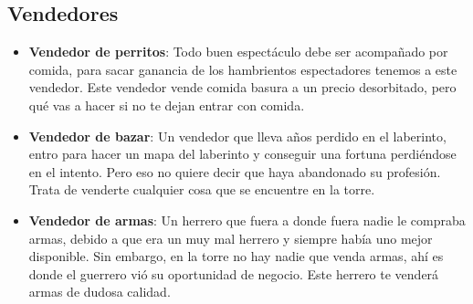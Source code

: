 \subsection{Vendedores}


\begin{itemize}
    \item \textbf{Vendedor de perritos}: Todo buen espectáculo debe ser
    acompañado por comida, para sacar ganancia de los hambrientos espectadores
    tenemos a este vendedor. Este vendedor vende comida basura a un precio
    desorbitado, pero qué vas a hacer si no te dejan entrar con comida.

    \item \textbf{Vendedor de bazar}: Un vendedor que lleva años perdido en el
    laberinto, entro para hacer un mapa del laberinto y conseguir una fortuna
    perdiéndose en el intento. Pero eso no quiere decir que haya abandonado su
    profesión. Trata de venderte cualquier cosa que se encuentre en la torre.

    \item \textbf{Vendedor de armas}: Un herrero que fuera a donde fuera nadie
    le compraba armas, debido a que era un muy mal herrero y siempre había uno
    mejor disponible. Sin embargo, en la torre no hay nadie que venda armas, ahí
    es donde el guerrero vió su oportunidad de negocio. Este herrero te venderá
    armas de dudosa calidad.
\end{itemize}